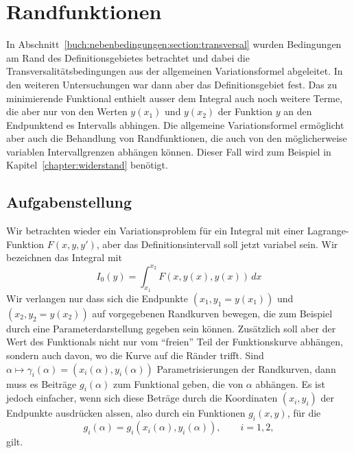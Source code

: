 %
%
%
\section{Randfunktionen
\label{buch:nebenbedingungen:section:randfunktionen}}
In Abschnitt~\ref{buch:nebenbedingungen:section:transversal} wurden
Bedingungen am Rand des Definitionsgebietes betrachtet und dabei
die Transversalitätsbedingungen aus der allgemeinen Variationsformel
abgeleitet.
In den weiteren Untersuchungen war dann aber das Definitionsgebiet
fest.
Das zu minimierende Funktional enthielt ausser dem Integral auch
noch weitere Terme, die aber nur von den Werten $y(x_1)$ und
$y(x_2)$ der Funktion $y$ an den Endpunktend es Intervalls
abhingen.
Die allgemeine Variationsformel ermöglicht aber auch die Behandlung
von Randfunktionen, die auch von den möglicherweise variablen
Intervallgrenzen abhängen können.
Dieser Fall wird zum Beispiel in Kapitel~\ref{chapter:widerstand}
benötigt.

%
%
\subsection{Aufgabenstellung
\label{buch:nebenbedingungen:randfunktionen:subsection:aufgabenstellung}}
Wir betrachten wieder ein Variationsproblem für ein Integral mit einer
Lagrange-Funktion $F(x,y,y')$, aber das Definitionsintervall soll
jetzt variabel sein.
Wir bezeichnen das Integral mit
\begin{equation*}
I_0(y)
=
\int_{x_1}^{x_2}
F(x,y(x),y(x))\,dx
\end{equation*}
Wir verlangen nur dass sich die Endpunkte $(x_1,y_1=y(x_1))$ und 
$(x_2,y_2=y(x_2))$ auf vorgegebenen Randkurven bewegen, die zum
Beispiel durch eine Parameterdarstellung gegeben sein können.
Zusätzlich soll aber der Wert des Funktionals nicht nur vom ``freien''
Teil der Funktionskurve abhängen, sondern auch davon, wo die Kurve auf
die Ränder trifft.
Sind $\alpha\mapsto \gamma_i(\alpha) = (x_i(\alpha),y_i(\alpha))$
Parametrisierungen der Randkurven, dann muss es Beiträge $g_i(\alpha)$
zum Funktional geben, die von $\alpha$ abhängen.
Es ist jedoch einfacher, wenn sich diese Beträge durch die Koordinaten
$(x_i,y_i)$ der Endpunkte ausdrücken alssen, also durch ein Funktionen
$g_i(x,y)$, für die
\[
g_i(\alpha) = g_i(x_i(\alpha), y_i(\alpha)), \qquad i=1,2,
\]
gilt.

